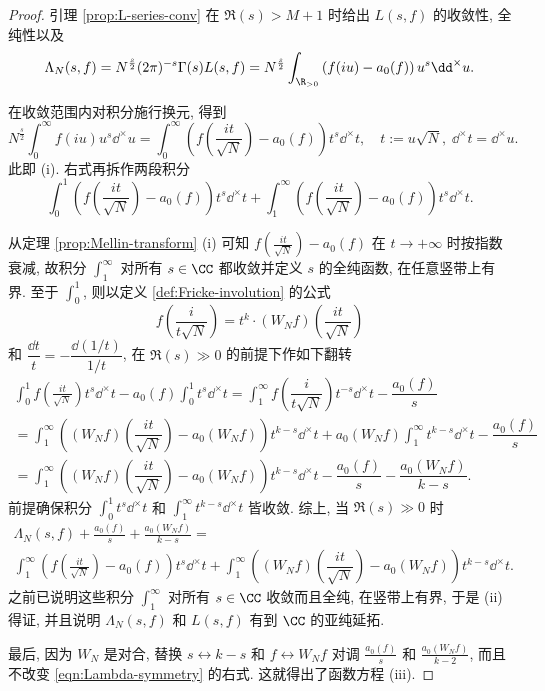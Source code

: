 \begin{proof}
	引理 \ref{prop:L-series-conv} 在 $\Re(s) > M+1$ 时给出 $L(s, f)$ 的收敛性, 全纯性以及
	\[ \Lambda_N(s,f) = N^{\frac{s}{2}} (2\pi)^{-s} \Gamma(s) L(s,f) = N^{\frac{s}{2}} \int_{\R_{>0}} \left( f(iu) -a_0(f)\right) u^s \dd^\times u. \]

	在收敛范围内对积分施行换元, 得到
	\[ N^{\frac{s}{2}} \int_0^\infty f(iu) u^s \dd^\times u = \int_0^\infty \left( f\left(\frac{it}{\sqrt{N}}\right) - a_0(f) \right) t^s \dd^\times t, \quad t := u\sqrt{N},\; \dd^\times t = \dd^\times u . \]
	此即 (i). 右式再拆作两段积分
	\[ \int_0^1 \left( f\left(\frac{it}{\sqrt{N}}\right) - a_0(f)\right) t^s \dd^\times t + \int_1^\infty \left( f\left(\frac{it}{\sqrt{N}}\right) - a_0(f) \right) t^s \dd^\times t. \]

	从定理 \ref{prop:Mellin-transform} (i) 可知 $f\left(\frac{it}{\sqrt{N}}\right) - a_0(f)$ 在 $t \to +\infty$ 时按指数衰减, 故积分 $\int_1^\infty$ 对所有 $s \in \CC$ 都收敛并定义 $s$ 的全纯函数, 在任意竖带上有界. 至于 $\int_0^1$, 则以定义 \ref{def:Fricke-involution} 的公式
	\[ f \left( \dfrac{i}{t \sqrt{N}} \right) = t^k \cdot (W_N f)\left( \dfrac{it}{\sqrt{N}} \right) \]
	和 $\dfrac{\dd t}{t} = -\dfrac{\dd(1/t)}{1/t}$, 在 $\Re(s) \gg 0$ 的前提下作如下翻转
	\begin{multline*}
		\int_0^1 f\left( \frac{it}{\sqrt{N}} \right) t^s \dd^\times t - a_0(f) \int_0^1 t^s \dd^\times t
		= \int_1^\infty f\left( \dfrac{i}{t \sqrt{N}} \right) t^{-s} \dd^\times t - \dfrac{a_0(f)}{s} \\
		= \int_1^\infty \left( (W_N f) \left( \dfrac{it}{\sqrt{N}} \right) - a_0(W_N f) \right) t^{k-s} \dd^\times t + a_0(W_N f) \int_1^\infty t^{k-s} \dd^\times t - \dfrac{a_0(f)}{s} \\
		= \int_1^\infty \left( (W_N f) \left( \dfrac{it}{\sqrt{N}} \right) - a_0(W_N f) \right) t^{k-s} \dd^\times t - \dfrac{a_0(f)}{s} - \dfrac{a_0(W_N f)}{k - s}.
	\end{multline*}
	前提确保积分 $\int_0^1 t^s \dd^\times t$ 和 $\int_1^\infty t^{k-s} \dd^\times t$ 皆收敛. 综上, 当 $\Re(s) \gg 0$ 时
	\begin{multline}\label{eqn:Lambda-symmetry}
		\Lambda_N(s, f) + \frac{a_0(f)}{s} + \frac{a_0(W_N f)}{k - s} = \\
		\int_1^\infty \left( f\left(\frac{it}{\sqrt{N}}\right) - a_0(f) \right) t^s \dd^\times t + \int_1^\infty \left( (W_N f) \left( \dfrac{it}{\sqrt{N}} \right) - a_0(W_N f) \right) t^{k-s} \dd^\times t.
	\end{multline}
	之前已说明这些积分 $\int_1^\infty$ 对所有 $s \in \CC$ 收敛而且全纯, 在竖带上有界, 于是 (ii) 得证, 并且说明 $\Lambda_N(s, f)$ 和 $L(s, f)$ 有到 $\CC$ 的亚纯延拓. 
	
	最后, 因为 $W_N$ 是对合, 替换 $s \leftrightarrow k-s$ 和 $f \leftrightarrow W_N f$ 对调 $\frac{a_0(f)}{s}$ 和 $\frac{a_0(W_N f)}{k-2}$, 而且不改变 \eqref{eqn:Lambda-symmetry} 的右式. 这就得出了函数方程 (iii).
\end{proof}

